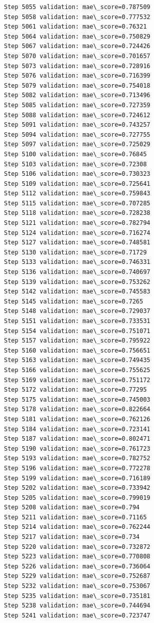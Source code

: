 \documentclass[11pt]{article}
\begin{document}
\begin{Verbatim}[commandchars=\\\{\}]
Step 5055 validation: mae\_score=0.787509
Step 5058 validation: mae\_score=0.777532
Step 5061 validation: mae\_score=0.76321
Step 5064 validation: mae\_score=0.750829
Step 5067 validation: mae\_score=0.724426
Step 5070 validation: mae\_score=0.701657
Step 5073 validation: mae\_score=0.728916
Step 5076 validation: mae\_score=0.716399
Step 5079 validation: mae\_score=0.754018
Step 5082 validation: mae\_score=0.713496
Step 5085 validation: mae\_score=0.727359
Step 5088 validation: mae\_score=0.724612
Step 5091 validation: mae\_score=0.743257
Step 5094 validation: mae\_score=0.727755
Step 5097 validation: mae\_score=0.725029
Step 5100 validation: mae\_score=0.76845
Step 5103 validation: mae\_score=0.72308
Step 5106 validation: mae\_score=0.730323
Step 5109 validation: mae\_score=0.725641
Step 5112 validation: mae\_score=0.759843
Step 5115 validation: mae\_score=0.707285
Step 5118 validation: mae\_score=0.728238
Step 5121 validation: mae\_score=0.782794
Step 5124 validation: mae\_score=0.716274
Step 5127 validation: mae\_score=0.748581
Step 5130 validation: mae\_score=0.71729
Step 5133 validation: mae\_score=0.746331
Step 5136 validation: mae\_score=0.740697
Step 5139 validation: mae\_score=0.753262
Step 5142 validation: mae\_score=0.745583
Step 5145 validation: mae\_score=0.7265
Step 5148 validation: mae\_score=0.729037
Step 5151 validation: mae\_score=0.733531
Step 5154 validation: mae\_score=0.751071
Step 5157 validation: mae\_score=0.795922
Step 5160 validation: mae\_score=0.756651
Step 5163 validation: mae\_score=0.749435
Step 5166 validation: mae\_score=0.755625
Step 5169 validation: mae\_score=0.751172
Step 5172 validation: mae\_score=0.77295
Step 5175 validation: mae\_score=0.745003
Step 5178 validation: mae\_score=0.822664
Step 5181 validation: mae\_score=0.762126
Step 5184 validation: mae\_score=0.723141
Step 5187 validation: mae\_score=0.802471
Step 5190 validation: mae\_score=0.761723
Step 5193 validation: mae\_score=0.782752
Step 5196 validation: mae\_score=0.772278
Step 5199 validation: mae\_score=0.716189
Step 5202 validation: mae\_score=0.733942
Step 5205 validation: mae\_score=0.799019
Step 5208 validation: mae\_score=0.794
Step 5211 validation: mae\_score=0.71165
Step 5214 validation: mae\_score=0.762244
Step 5217 validation: mae\_score=0.734
Step 5220 validation: mae\_score=0.732872
Step 5223 validation: mae\_score=0.770808
Step 5226 validation: mae\_score=0.736064
Step 5229 validation: mae\_score=0.752687
Step 5232 validation: mae\_score=0.753067
Step 5235 validation: mae\_score=0.735181
Step 5238 validation: mae\_score=0.744694
Step 5241 validation: mae\_score=0.723747

\end{Verbatim}
\end{document}
